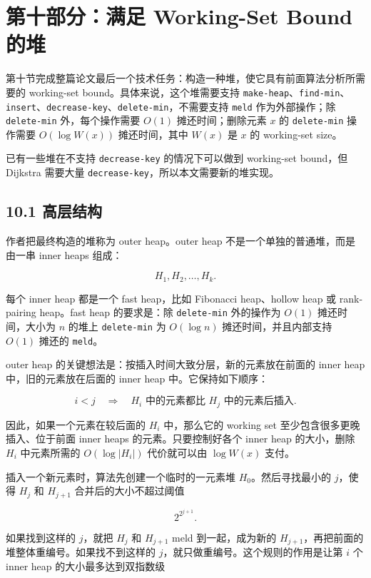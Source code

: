 \documentclass[UTF8]{ctexart}
\begin{document}
\section*{第十部分：满足 Working-Set Bound 的堆}

第十节完成整篇论文最后一个技术任务：构造一种堆，使它具有前面算法分析所需要的 working-set bound。具体来说，这个堆需要支持 \texttt{make-heap}、\texttt{find-min}、\texttt{insert}、\texttt{decrease-key}、\texttt{delete-min}，不需要支持 \texttt{meld} 作为外部操作；除 \texttt{delete-min} 外，每个操作需要 \(O(1)\) 摊还时间；删除元素 \(x\) 的 \texttt{delete-min} 操作需要 \(O(\log W(x))\) 摊还时间，其中 \(W(x)\) 是 \(x\) 的 working-set size。

已有一些堆在不支持 \texttt{decrease-key} 的情况下可以做到 working-set bound，但 Dijkstra 需要大量 \texttt{decrease-key}，所以本文需要新的堆实现。

\subsection*{10.1 高层结构}

作者把最终构造的堆称为 outer heap。outer heap 不是一个单独的普通堆，而是由一串 inner heaps 组成：

\[
H_1,H_2,\ldots,H_k.
\]

每个 inner heap 都是一个 fast heap，比如 Fibonacci heap、hollow heap 或 rank-pairing heap。fast heap 的要求是：除 \texttt{delete-min} 外的操作为 \(O(1)\) 摊还时间，大小为 \(n\) 的堆上 \texttt{delete-min} 为 \(O(\log n)\) 摊还时间，并且内部支持 \(O(1)\) 摊还的 \texttt{meld}。

outer heap 的关键想法是：按插入时间大致分层，新的元素放在前面的 inner heap 中，旧的元素放在后面的 inner heap 中。它保持如下顺序：

\[
i<j \quad \Rightarrow \quad H_i \text{ 中的元素都比 } H_j \text{ 中的元素后插入}.
\]

因此，如果一个元素在较后面的 \(H_i\) 中，那么它的 working set 至少包含很多更晚插入、位于前面 inner heaps 的元素。只要控制好各个 inner heap 的大小，删除 \(H_i\) 中元素所需的 \(O(\log |H_i|)\) 代价就可以由 \(\log W(x)\) 支付。

插入一个新元素时，算法先创建一个临时的一元素堆 \(H_0\)。然后寻找最小的 \(j\)，使得 \(H_j\) 和 \(H_{j+1}\) 合并后的大小不超过阈值

\[
2^{2^{j+1}}.
\]

如果找到这样的 \(j\)，就把 \(H_j\) 和 \(H_{j+1}\) meld 到一起，成为新的 \(H_{j+1}\)，再把前面的堆整体重编号。如果找不到这样的 \(j\)，就只做重编号。这个规则的作用是让第 \(i\) 个 inner heap 的大小最多达到双指数级
\end{document}
